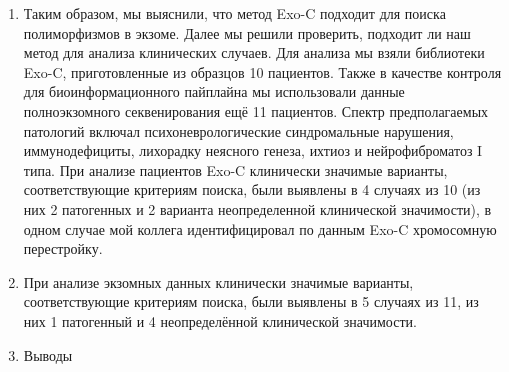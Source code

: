 \documentclass[a4paper,14pt]{extarticle}
\begin{document}
\begin{enumerate}
\item Таким образом, мы выяснили, что метод Exo-C подходит для поиска полиморфизмов в экзоме.
Далее мы решили проверить, подходит ли наш метод для анализа клинических случаев.
Для анализа мы взяли библиотеки Exo-C, приготовленные из образцов 10 пациентов.
Также в качестве контроля для биоинформационного пайплайна мы использовали данные полноэкзомного секвенирования ещё 11 пациентов.
Спектр предполагаемых патологий включал психоневрологические синдромальные нарушения, иммунодефициты, лихорадку неясного генеза, ихтиоз и нейрофиброматоз I типа.
При анализе пациентов Exo-C клинически значимые варианты, соответствующие критериям поиска, были выявлены в 4 случаях из 10 (из них 2 патогенных и 2 варианта неопределенной клинической значимости), в одном случае мой коллега идентифицировал по данным Exo-C хромосомную перестройку.

\item При анализе экзомных данных клинически значимые варианты, соответствующие критериям поиска, были выявлены в 5 случаях из 11, из них 1 патогенный и 4 неопределённой клинической значимости.

\item Выводы

\end{enumerate}
\end{document}
